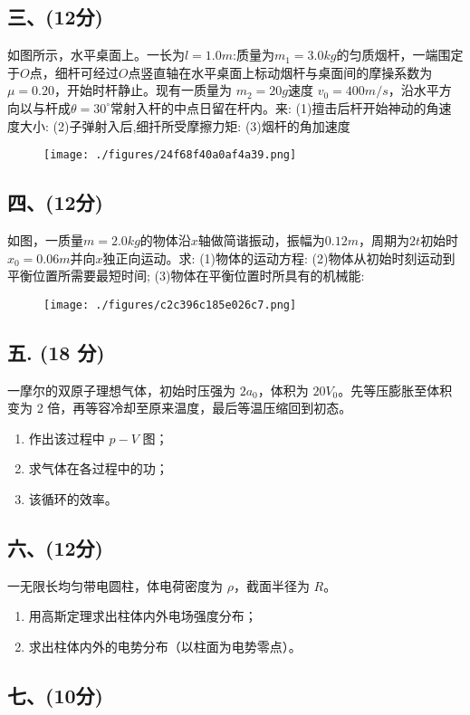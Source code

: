 \subsection{三、(12分)}
如图所示，水平桌面上。一长为$l = 1.0m$:质量为$m_1 = 3.0kg$的匀质烟杆，一端围定于$O$点，细杆可经过$O$点竖直轴在水平桌面上标动烟杆与桌面间的摩操系数为$\mu=0.20$，开始时杆静止。现有一质量为 $m_2 = 20g$速度 $v_0 = 400m/s$，沿水平方向以与杆成$\theta = 30^\circ$常射入杆的中点日留在杆内。来:
(1)擅击后杆开始神动的角速度大小:
(2)子弹射入后,细扦所受摩擦力矩:
(3)烟杆的角加速度
\begin{figure}[ht]
\centering
\texttt{[image: ./figures/24f68f40a0af4a39.png]}
\caption{} \label{fig_NJU10_5}
\end{figure}
\subsection{四、(12分)}
如图，一质量$m=2.0kg$的物体沿$x$轴做简谐振动，振幅为$0.12m$，周期为$2t$初始时$x_0=0.06m$并向$x$独正向运动。求:
(1)物体的运动方程:
(2)物体从初始时刻运动到平衡位置所需要最短时间;
(3)物体在平衡位置时所具有的机械能:
\begin{figure}[ht]
\centering
\texttt{[image: ./figures/c2c396c185e026c7.png]}
\caption{} \label{fig_NJU10_6}
\end{figure}
\subsection{五. (18 分)}
一摩尔的双原子理想气体，初始时压强为 $2a_0$，体积为 $20V_0$。先等压膨胀至体积变为 2 倍，再等容冷却至原来温度，最后等温压缩回到初态。
\begin{enumerate}
    \item 作出该过程中 $p-V$ 图；
    \item 求气体在各过程中的功；
    \item 该循环的效率。
\end{enumerate}
\subsection{六、(12分)}
一无限长均匀带电圆柱，体电荷密度为 $\rho$，截面半径为 $R$。
\begin{enumerate}
    \item 用高斯定理求出柱体内外电场强度分布；
    \item 求出柱体内外的电势分布（以柱面为电势零点）。
\end{enumerate}
\subsection{七、(10分)}